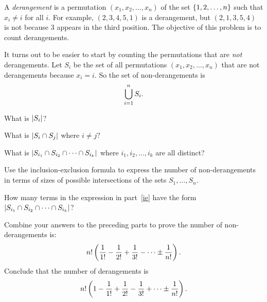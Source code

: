 \documentclass[11pt,twoside]{article}
\begin{document}
\begin{problem}
A \textit{derangement} is a permutation $(x_1, x_2, \dots, x_n)$ of
the set $\left\{1, 2, \dots, n\right\}$ such that $x_i \neq i$ for all $i$.
For example, $(2, 3, 4, 5, 1)$ is a derangement, but $(2, 1, 3, 5, 4)$
is not because 3 appears in the third position.  The objective of this
problem is to count derangements.

It turns out to be easier to start by counting the permutations that are
\textit{not} derangements.  Let $S_i$ be the set of all permutations
$(x_1, x_2, \dots, x_n)$ that are not derangements because $x_i = i$.
So the set of non-derangements is
\[
\bigcup_{i=1}^n S_i.
\]

\bparts

\ppart What is $\left|S_i\right|$?


\ppart What is $\left|S_i \cap S_j\right|$ where $i \neq j$?


\ppart What is $\left|S_{i_1} \cap S_{i_2} \cap \cdots \cap S_{i_k}\right|$
where $i_1, i_2, \dots, i_k$ are all distinct?


\ppart\label{ie} Use the inclusion-exclusion formula to express the number of
non-derangements in terms of sizes of possible intersections of the sets
$S_1, \dots, S_n$.


\ppart How many terms in the expression in part~\eqref{ie} have the form
$\left|S_{i_1} \cap S_{i_2} \cap \cdots \cap S_{i_k}\right|$?


\ppart Combine your answers to the preceding parts to prove the number of
non-derangements is:
\[
n! \left(\frac{1}{1!} - \frac{1}{2!} + \frac{1}{3!} - \cdots \pm \frac{1}{n!}\right).
\]
Conclude that the number of derangements is
\[
n! \left(1 - \frac{1}{1!} + \frac{1}{2!} - \frac{1}{3!} + \cdots \pm \frac{1}{n!}\right).
\]


\end{problem}
\end{document}
